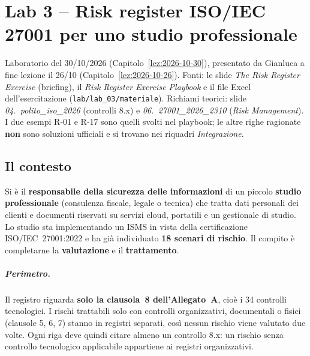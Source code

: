 \chapter{Lab 3 -- Risk register ISO/IEC 27001 per uno studio professionale}
\label{lab:03}

\begin{nota}[Fonte]
Laboratorio del 30/10/2026 (Capitolo~\ref{lez:2026-10-30}), presentato da Gianluca a fine lezione il
26/10 (Capitolo~\ref{lez:2026-10-26}). Fonti: le slide \emph{The Risk Register Exercise} (briefing), il
\emph{Risk Register Exercise Playbook} e il file Excel dell'esercitazione
(\texttt{lab/lab\_03/materiale}). Richiami teorici: slide \emph{04.~polito\_iso\_2026} (controlli 8.x) e
\emph{06.~27001\_2026\_2310} (\emph{Risk Management}). I due esempi R-01 e R-17 sono quelli svolti nel
playbook; le altre righe ragionate \textbf{non} sono soluzioni ufficiali e si trovano nei riquadri
\emph{Integrazione}.
\end{nota}

\section{Il contesto}

Si è il \textbf{responsabile della sicurezza delle informazioni} di un piccolo \textbf{studio
professionale} (consulenza fiscale, legale o tecnica) che tratta dati personali dei clienti e documenti
riservati su servizi cloud, portatili e un gestionale di studio. Lo studio sta implementando un ISMS in
vista della certificazione ISO/IEC~27001:2022 e ha già individuato \textbf{18 scenari di rischio}. Il
compito è completarne la \textbf{valutazione} e il \textbf{trattamento}.

\paragraph{Perimetro.} Il registro riguarda \textbf{solo la clausola~8 dell'Allegato~A}, cioè i 34
controlli tecnologici. I rischi trattabili solo con controlli organizzativi, documentali o fisici
(clausole 5, 6, 7) stanno in registri separati, così nessun rischio viene valutato due volte. Ogni riga
deve quindi citare almeno un controllo 8.x: un rischio senza controllo tecnologico applicabile appartiene
ai registri organizzativi.

